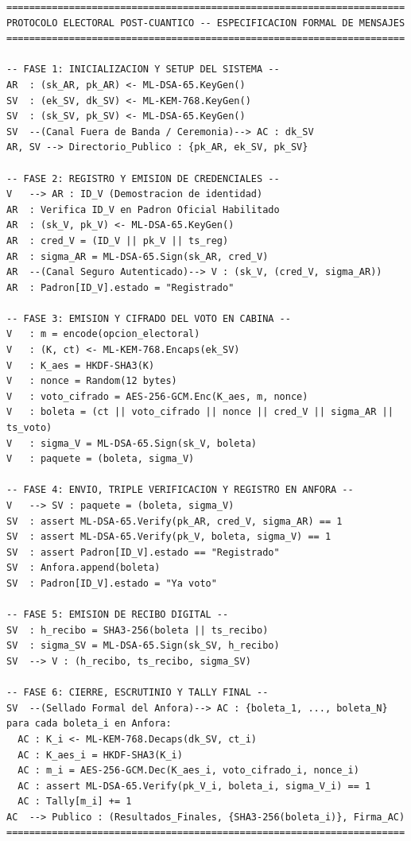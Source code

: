 \documentclass[11pt,a4paper,twoside,openright]{book}
\theoremstyle{plain}
\theoremstyle{definition}
\theoremstyle{remark}
\begin{document}
\begin{lstlisting}[caption={Especificaci\'on de intercambio de mensajes en notaci\'on Alice-Bob}]
======================================================================
PROTOCOLO ELECTORAL POST-CUANTICO -- ESPECIFICACION FORMAL DE MENSAJES
======================================================================

-- FASE 1: INICIALIZACION Y SETUP DEL SISTEMA --
AR  : (sk_AR, pk_AR) <- ML-DSA-65.KeyGen()
SV  : (ek_SV, dk_SV) <- ML-KEM-768.KeyGen()
SV  : (sk_SV, pk_SV) <- ML-DSA-65.KeyGen()
SV  --(Canal Fuera de Banda / Ceremonia)--> AC : dk_SV
AR, SV --> Directorio_Publico : {pk_AR, ek_SV, pk_SV}

-- FASE 2: REGISTRO Y EMISION DE CREDENCIALES --
V   --> AR : ID_V (Demostracion de identidad)
AR  : Verifica ID_V en Padron Oficial Habilitado
AR  : (sk_V, pk_V) <- ML-DSA-65.KeyGen()
AR  : cred_V = (ID_V || pk_V || ts_reg)
AR  : sigma_AR = ML-DSA-65.Sign(sk_AR, cred_V)
AR  --(Canal Seguro Autenticado)--> V : (sk_V, (cred_V, sigma_AR))
AR  : Padron[ID_V].estado = "Registrado"

-- FASE 3: EMISION Y CIFRADO DEL VOTO EN CABINA --
V   : m = encode(opcion_electoral)
V   : (K, ct) <- ML-KEM-768.Encaps(ek_SV)
V   : K_aes = HKDF-SHA3(K)
V   : nonce = Random(12 bytes)
V   : voto_cifrado = AES-256-GCM.Enc(K_aes, m, nonce)
V   : boleta = (ct || voto_cifrado || nonce || cred_V || sigma_AR || ts_voto)
V   : sigma_V = ML-DSA-65.Sign(sk_V, boleta)
V   : paquete = (boleta, sigma_V)

-- FASE 4: ENVIO, TRIPLE VERIFICACION Y REGISTRO EN ANFORA --
V   --> SV : paquete = (boleta, sigma_V)
SV  : assert ML-DSA-65.Verify(pk_AR, cred_V, sigma_AR) == 1
SV  : assert ML-DSA-65.Verify(pk_V, boleta, sigma_V) == 1
SV  : assert Padron[ID_V].estado == "Registrado"
SV  : Anfora.append(boleta)
SV  : Padron[ID_V].estado = "Ya voto"

-- FASE 5: EMISION DE RECIBO DIGITAL --
SV  : h_recibo = SHA3-256(boleta || ts_recibo)
SV  : sigma_SV = ML-DSA-65.Sign(sk_SV, h_recibo)
SV  --> V : (h_recibo, ts_recibo, sigma_SV)

-- FASE 6: CIERRE, ESCRUTINIO Y TALLY FINAL --
SV  --(Sellado Formal del Anfora)--> AC : {boleta_1, ..., boleta_N}
para cada boleta_i en Anfora:
  AC : K_i <- ML-KEM-768.Decaps(dk_SV, ct_i)
  AC : K_aes_i = HKDF-SHA3(K_i)
  AC : m_i = AES-256-GCM.Dec(K_aes_i, voto_cifrado_i, nonce_i)
  AC : assert ML-DSA-65.Verify(pk_V_i, boleta_i, sigma_V_i) == 1
  AC : Tally[m_i] += 1
AC  --> Publico : (Resultados_Finales, {SHA3-256(boleta_i)}, Firma_AC)
======================================================================
\end{lstlisting}
\end{document}
